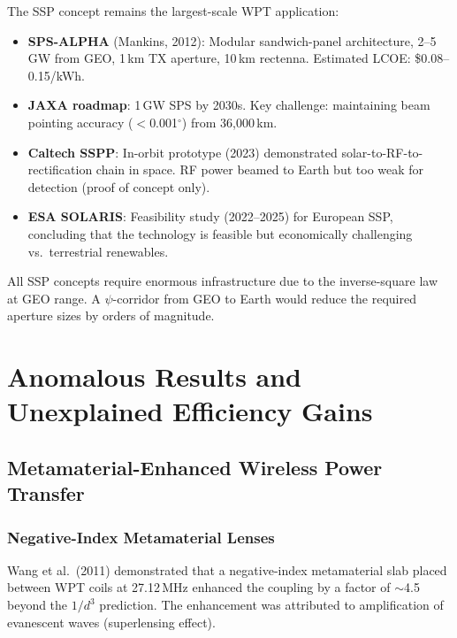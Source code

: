 \documentclass[11pt,a4paper]{article}
\begin{document}
The SSP concept remains the largest-scale WPT application:

\begin{itemize}
\item \textbf{SPS-ALPHA} (Mankins, 2012): Modular sandwich-panel
architecture, 2--5\,GW from GEO, 1\,km TX aperture, 10\,km rectenna.
Estimated LCOE: \$0.08--0.15/kWh.

\item \textbf{JAXA roadmap}: 1\,GW SPS by 2030s. Key challenge:
maintaining beam pointing accuracy ($<$0.001$^\circ$) from 36{,}000\,km.

\item \textbf{Caltech SSPP}: In-orbit prototype (2023) demonstrated
solar-to-RF-to-rectification chain in space. RF power beamed to
Earth but too weak for detection (proof of concept only).

\item \textbf{ESA SOLARIS}: Feasibility study (2022--2025) for
European SSP, concluding that the technology is feasible but
economically challenging vs.\ terrestrial renewables.
\end{itemize}

All SSP concepts require enormous infrastructure due to the
inverse-square law at GEO range. A $\psi$-corridor from GEO to
Earth would reduce the required aperture sizes by orders of
magnitude.

\section{Anomalous Results and Unexplained Efficiency Gains}

\subsection{Metamaterial-Enhanced Wireless Power Transfer}

\subsubsection{Negative-Index Metamaterial Lenses}

Wang et al.\ (2011) demonstrated that a negative-index metamaterial
slab placed between WPT coils at 27.12\,MHz enhanced the coupling
by a factor of $\sim$4.5 beyond the $1/d^3$ prediction. The
enhancement was attributed to amplification of evanescent waves
(superlensing effect).
\end{document}
